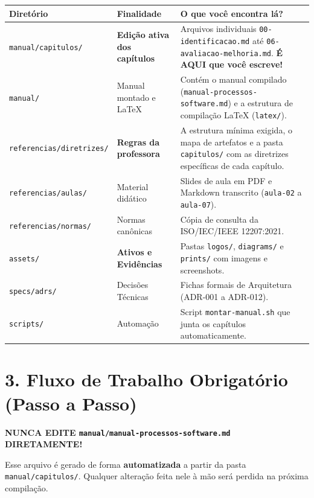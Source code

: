 \documentclass[11pt,a4paper]{article}
\begin{document}
\vspace{0.2cm}

\begin{table}[h!]
\small
\centering
\begin{tabularx}{\textwidth}{p{3.8cm} p{3.2cm} X}
\toprule
\textbf{Diretório} & \textbf{Finalidade} & \textbf{O que você encontra lá?} \\
\midrule
\texttt{manual/capitulos/} & \textbf{Edição ativa dos capítulos} & Arquivos individuais \texttt{00-identificacao.md} até \texttt{06-avaliacao-melhoria.md}. \textbf{É AQUI que você escreve!} \\
\midrule
\texttt{manual/} & Manual montado e LaTeX & Contém o manual compilado (\texttt{manual-processos-software.md}) e a estrutura de compilação LaTeX (\texttt{latex/}). \\
\midrule
\texttt{referencias/diretrizes/} & \textbf{Regras da professora} & A estrutura mínima exigida, o mapa de artefatos e a pasta \texttt{capitulos/} com as diretrizes específicas de cada capítulo. \\
\midrule
\texttt{referencias/aulas/} & Material didático & Slides de aula em PDF e Markdown transcrito (\texttt{aula-02} a \texttt{aula-07}). \\
\midrule
\texttt{referencias/normas/} & Normas canônicas & Cópia de consulta da ISO/IEC/IEEE 12207:2021. \\
\midrule
\texttt{assets/} & \textbf{Ativos e Evidências} & Pastas \texttt{logos/}, \texttt{diagrams/} e \texttt{prints/} com imagens e screenshots. \\
\midrule
\texttt{specs/adrs/} & Decisões Técnicas & Fichas formais de Arquitetura (ADR-001 a ADR-012). \\
\midrule
\texttt{scripts/} & Automação & Script \texttt{montar-manual.sh} que junta os capítulos automaticamente. \\
\bottomrule
\end{tabularx}
\end{table}

\section{3. Fluxo de Trabalho Obrigatório (Passo a Passo)}

\begin{alertaCritico}
\textbf{NUNCA EDITE \texttt{manual/manual-processos-software.md} DIRETAMENTE!}

Esse arquivo é gerado de forma \textbf{automatizada} a partir da pasta \texttt{manual/capitulos/}. Qualquer alteração feita nele à mão será perdida na próxima compilação.
\end{alertaCritico}
\end{document}
